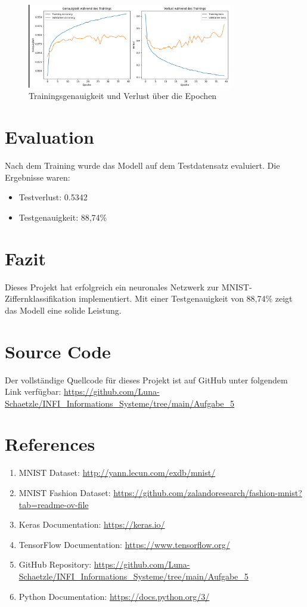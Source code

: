 \documentclass[12pt,a4paper]{article}
\begin{document}
\begin{figure}[h!]
    \centering
    \includegraphics[width=0.8\textwidth]{image.png}
    \caption{Trainingsgenauigkeit und Verlust über die Epochen}
    \label{fig:training-curves}
\end{figure}

\section*{Evaluation}
Nach dem Training wurde das Modell auf dem Testdatensatz evaluiert. Die Ergebnisse waren:
\begin{itemize}
    \item Testverlust: 0.5342
    \item Testgenauigkeit: 88,74\%
\end{itemize}

\section*{Fazit}
Dieses Projekt hat erfolgreich ein neuronales Netzwerk zur MNIST-Ziffernklassifikation implementiert. Mit einer Testgenauigkeit von 88,74\% zeigt das Modell eine solide Leistung.

\section*{Source Code}
Der vollständige Quellcode für dieses Projekt ist auf GitHub unter folgendem Link verfügbar: \url{https://github.com/Luna-Schaetzle/INFI_Informations_Systeme/tree/main/Aufgabe_5}

\section*{References}
\begin{enumerate}
    \item MNIST Dataset: \url{http://yann.lecun.com/exdb/mnist/}
    \item MNIST Fashion Dataset: \url{https://github.com/zalandoresearch/fashion-mnist?tab=readme-ov-file}
    \item Keras Documentation: \url{https://keras.io/}
    \item TensorFlow Documentation: \url{https://www.tensorflow.org/}
    \item GitHub Repository: \url{https://github.com/Luna-Schaetzle/INFI_Informations_Systeme/tree/main/Aufgabe_5}
    \item Python Documentation: \url{https://docs.python.org/3/}
\end{enumerate}
\end{document}
